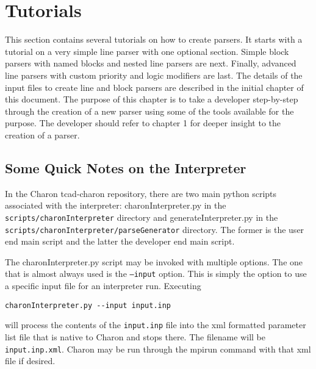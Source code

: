 

\section{Tutorials}


This section contains several tutorials on how to create parsers.  It
starts with a tutorial on a very simple line parser with one optional
section. Simple block parsers with named blocks and nested line
parsers are next.  Finally, advanced line parsers with custom priority
and logic modifiers are last.  The details of the input files to
create line and block parsers are described in the initial chapter of
this document.  The purpose of this chapter is to take a developer
step-by-step through the creation of a new parser using some of the
tools available for the purpose.  The developer should refer to
chapter 1 for deeper insight to the creation of a parser.

\subsection{Some Quick Notes on the Interpreter}

In the Charon tcad-charon repository, there are two main python
scripts associated with the interpreter: charonInterpreter.py in the
\texttt{scripts/charonInterpreter} directory and
generateInterpreter.py in the
\texttt{scripts/charonInterpreter/parseGenerator} directory.  The
former is the user end main script and the latter the developer end
main script.

The charonInterpreter.py script may be invoked with multiple options.
The one that is almost always used is the \texttt{--input} option.
This is simply the option to use a specific input file for an
interpreter run.  Executing
\begin{lstlisting}
charonInterpreter.py --input input.inp
\end{lstlisting}
will process the contents of the \texttt{input.inp} file into the xml
formatted parameter list file that is native to Charon and stops
there.  The filename will be \texttt{input.inp.xml}.  Charon may be
run through the mpirun command with that xml file if desired.


